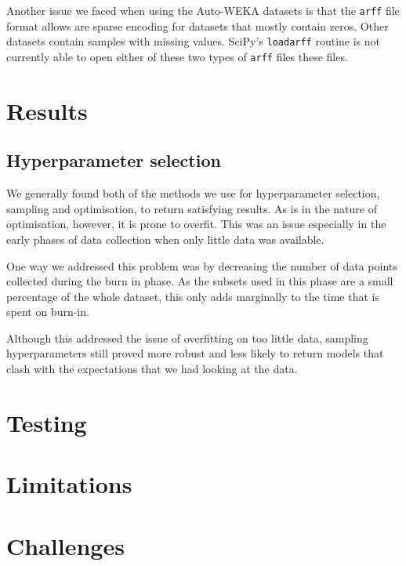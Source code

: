 \documentclass[a4paper,12pt,twoside,openright]{report}
\begin{document}
Another issue we faced when using the Auto-WEKA datasets is that the \texttt{arff} file format allows are sparse encoding for datasets that mostly contain zeros. Other datasets contain samples with missing values. SciPy's \texttt{loadarff} routine is not currently able to open either of these two types of \texttt{arff} files these files.


\section{Results}

\subsection{Hyperparameter selection}
We generally found both of the methods we use for hyperparameter selection, sampling and optimisation, to return satisfying results. As is in the nature of optimisation, however, it is prone to overfit. This was  an issue especially in the early phases of data collection when only little data was available.

One way we addressed this problem was by decreasing the number of data points collected during the burn in phase. As the subsets used in this phase are a small percentage of the whole dataset, this only adds marginally to the time that is spent on burn-in.

Although this addressed the issue of overfitting on too little data, sampling hyperparameters still proved more robust and less likely to return models that clash with the expectations that we had looking at the data.






\section{Testing}
\section{Limitations}
\section{Challenges}
\end{document}
